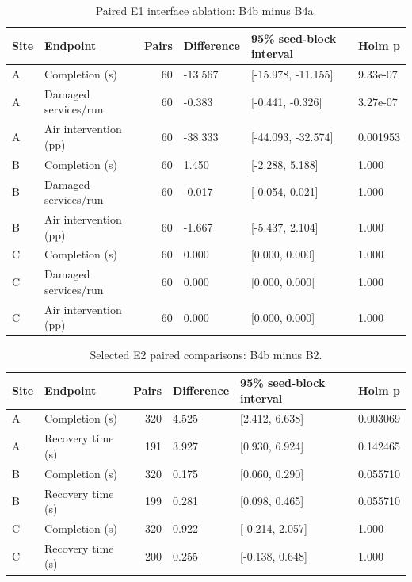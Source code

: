\documentclass[11pt,a4paper]{article}
\begin{document}
\begin{table}[H]
\centering
\small
\setlength{\tabcolsep}{3pt}
\caption{Paired E1 interface ablation: B4b minus B4a.}
\label{tab:extended_table5}
\begin{tabularx}{\textwidth}{@{}lYrYYY@{}}
\toprule
Site & Endpoint & Pairs & Difference & 95\% seed-block interval & Holm p \\
\midrule
A & Completion (s) & 60 & -13.567 & [-15.978, -11.155] & 9.33e-07 \\
A & Damaged services/run & 60 & -0.383 & [-0.441, -0.326] & 3.27e-07 \\
A & Air intervention (pp) & 60 & -38.333 & [-44.093, -32.574] & 0.001953 \\
B & Completion (s) & 60 & 1.450 & [-2.288, 5.188] & 1.000 \\
B & Damaged services/run & 60 & -0.017 & [-0.054, 0.021] & 1.000 \\
B & Air intervention (pp) & 60 & -1.667 & [-5.437, 2.104] & 1.000 \\
C & Completion (s) & 60 & 0.000 & [0.000, 0.000] & 1.000 \\
C & Damaged services/run & 60 & 0.000 & [0.000, 0.000] & 1.000 \\
C & Air intervention (pp) & 60 & 0.000 & [0.000, 0.000] & 1.000 \\
\bottomrule
\end{tabularx}
\end{table}

\begin{table}[H]
\centering
\small
\setlength{\tabcolsep}{3pt}
\caption{Selected E2 paired comparisons: B4b minus B2.}
\label{tab:extended_table6}
\begin{tabularx}{\textwidth}{@{}lYrYYY@{}}
\toprule
Site & Endpoint & Pairs & Difference & 95\% seed-block interval & Holm p \\
\midrule
A & Completion (s) & 320 & 4.525 & [2.412, 6.638] & 0.003069 \\
A & Recovery time (s) & 191 & 3.927 & [0.930, 6.924] & 0.142465 \\
B & Completion (s) & 320 & 0.175 & [0.060, 0.290] & 0.055710 \\
B & Recovery time (s) & 199 & 0.281 & [0.098, 0.465] & 0.055710 \\
C & Completion (s) & 320 & 0.922 & [-0.214, 2.057] & 1.000 \\
C & Recovery time (s) & 200 & 0.255 & [-0.138, 0.648] & 1.000 \\
\bottomrule
\end{tabularx}
\end{table}
\end{document}
